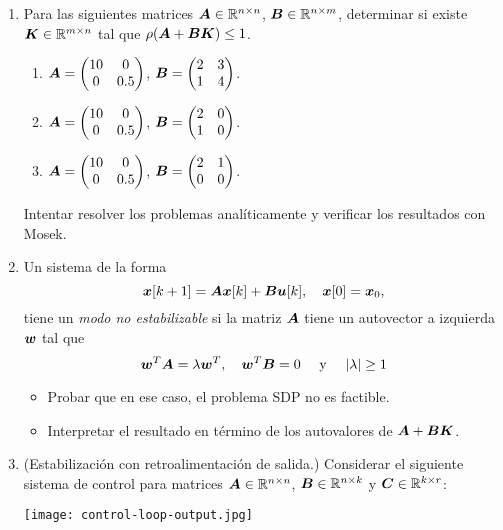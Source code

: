 \documentclass[11pt]{article}
\begin{document}
\begin{enumerate}[resume]
\item Para las siguientes matrices $\bm{A} \in \mathbb{R}^{n \times n}$, $\bm{B} \in \mathbb{R}^{n \times m}$, determinar si existe $\bm{K} \in \mathbb{R}^{m \times n}$ tal que $\rho(\bm{A} + \bm{B} \bm{K}) \le 1$.
\begin{enumerate}
\item $\bm{A} = \begin{pmatrix} 10 & 0 \\ 0 & 0.5 \end{pmatrix}$, $\bm{B} = \begin{pmatrix} 2 & 3 \\ 1 & 4 \end{pmatrix}$.
\item $\bm{A} = \begin{pmatrix} 10 & 0 \\ 0 & 0.5 \end{pmatrix}$, $\bm{B} = \begin{pmatrix} 2 & 0 \\ 1 & 0 \end{pmatrix}$.
\item $\bm{A} = \begin{pmatrix} 10 & 0 \\ 0 & 0.5 \end{pmatrix}$, $\bm{B} = \begin{pmatrix} 2 & 1 \\ 0 & 0 \end{pmatrix}$.
\end{enumerate}

Intentar resolver los problemas analíticamente y verificar los resultados con Mosek.

\item Un sistema de la forma
$$
\bm{x}[k+1] = \bm{A}\bm{x}[k] + \bm{B}\bm{u}[k], \quad \bm{x}[0] = \bm{x}_0,
$$
tiene un \emph{modo no estabilizable} si la matriz $\bm{A}$ tiene un autovector a izquierda $\bm{w}$ tal que
$$
\bm{w}^T \bm{A} = \lambda \bm{w}^T, \quad \bm{w}^T \bm{B} = 0 \quad \text{ y } \quad |\lambda| \ge 1
$$

\begin{itemize}
\item Probar que en ese caso, el problema SDP no es factible.
\item Interpretar el resultado en término de los autovalores de $\bm{A} + \bm{B} \bm{K}$.
\end{itemize}

\item (Estabilización con retroalimentación de salida.) Considerar el siguiente sistema de control para matrices $\bm{A} \in \mathbb{R}^{n\times n}$, $\bm{B} \in \mathbb{R}^{n \times k}$ y $\bm{C} \in \mathbb{R}^{k \times r}$:
\begin{center}
\texttt{[image: control-loop-output.jpg]}
\end{center}


\end{enumerate}
\end{document}
